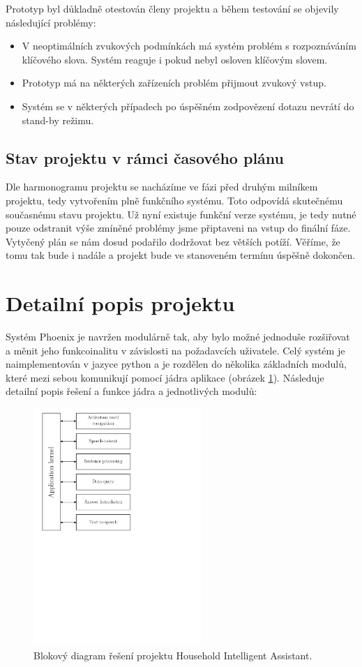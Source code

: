 \documentclass[12pt,a4paper]{article}
\begin{document}
Prototyp byl důkladně otestován členy projektu a během testování se objevily následující problémy: 
\begin{itemize}
	\item V neoptimálních zvukových podmínkách má systém problém s rozpoznáváním klíčového slova. Systém reaguje i pokud nebyl osloven klíčovým slovem.
	\item Prototyp má na některých zařízeních problém přijmout zvukový vstup.
	\item Systém se v některých případech po úspěšném zodpovězení dotazu nevrátí do stand-by režimu.
\end{itemize}


\subsection*{Stav projektu v rámci časového plánu}
Dle harmonogramu projektu se nacházíme ve fázi před druhým milníkem projektu, tedy vytvořením plně funkčního systému. Toto odpovídá skutečnému současnému stavu projektu. Už nyní existuje funkční verze systému, je tedy nutné pouze odstranit výše zmíněné problémy jsme připtaveni na vstup do finální fáze. Vytyčený plán se nám dosud podařilo dodržovat bez větších potíží. Věříme, že tomu tak bude i nadále a projekt bude ve stanoveném termínu úspěšně dokončen.



\section*{Detailní popis projektu}
Systém Phoenix je navržen modulárně tak, aby bylo možné jednoduše rozšiřovat a měnit jeho funkcoinalitu v závislosti na požadavcích uživatele. Celý systém je naimplementován v jazyce python a je rozdělen do několika základních modulů, které mezi sebou komunikují pomocí jádra aplikace (obrázek \ref*{fig:diagram api}). Následuje detailní popis řešení a funkce jádra a jednotlivých modulů:
\begin{figure}[ht]
	\begin{center}
		\includegraphics[height = 9cm]{blockDiagram.pdf}
		\caption{Blokový diagram řešení projektu Household Intelligent Assistant.}
		\label{fig:diagram api}
	\end{center}
\end{figure}
\end{document}
